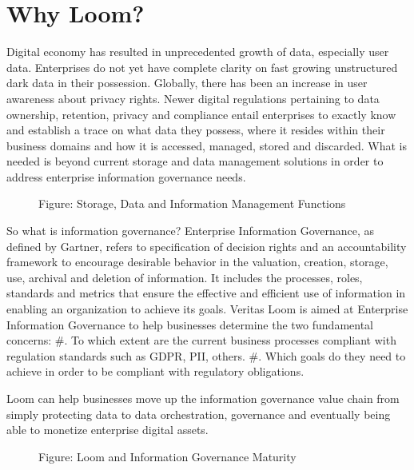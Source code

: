 \documentclass[letterpaper,10pt,english]{sphinxmanual}
\begin{document}
\chapter{Why Loom?}
\label{\detokenize{mcdmp_concepts:why-loom}}
Digital economy has resulted in unprecedented growth of data, especially user data. Enterprises do not yet have complete clarity on fast growing unstructured dark data in their possession. Globally, there has been an increase in user awareness about privacy rights. Newer digital regulations pertaining to data ownership, retention, privacy and compliance entail enterprises to exactly know and establish a trace on what data they possess, where it resides within their business domains and how it is accessed, managed, stored and discarded.  What is needed is beyond current storage and data management solutions in order to address enterprise information governance needs.

\begin{figure}[htbp]
\centering
\capstart

\noindent{}
\caption{Figure: Storage, Data and Information Management Functions}\label{\detokenize{mcdmp_concepts:id2}}\end{figure}

So what is information governance? Enterprise Information Governance, as defined by Gartner, refers to specification of decision rights and an accountability framework to encourage desirable behavior in the valuation, creation, storage, use, archival and deletion of information. It includes the processes, roles, standards and metrics that ensure the effective and efficient use of information in enabling an organization to achieve its goals. Veritas Loom is aimed at Enterprise Information Governance to help businesses determine the two fundamental concerns:
\#. To which extent are the current business processes compliant with regulation standards such as GDPR, PII, others.
\#. Which goals do they need to achieve in order to be compliant with regulatory obligations.

Loom can help businesses move up the information governance value chain from simply protecting data to data orchestration, governance and eventually being able to monetize enterprise digital assets.

\begin{figure}[htbp]
\centering
\capstart

\noindent{}
\caption{Figure: Loom and Information Governance Maturity}\label{\detokenize{mcdmp_concepts:id3}}\end{figure}
\end{document}
